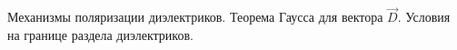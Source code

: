 \documentclass[__main__.tex]{subfiles}
\begin{document}
Механизмы поляризации диэлектриков. Теорема Гаусса для вектора $\vec{D}$. Условия на границе раздела диэлектриков.\\ 

\end{document}
